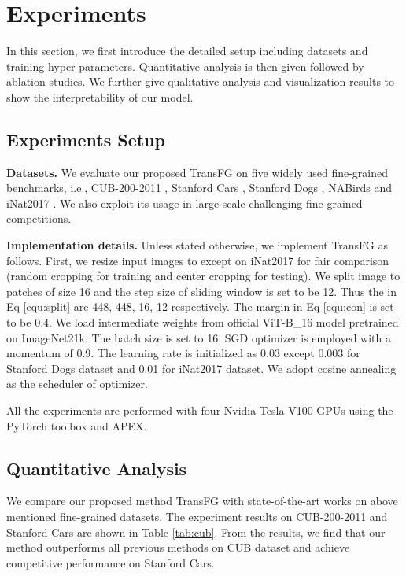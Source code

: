 \section{Experiments}
\label{sec:exp}

In this section, we first introduce the detailed setup including datasets and training hyper-parameters. Quantitative analysis is then given followed by ablation studies. We further give qualitative analysis and visualization results to show the interpretability of our model.

\subsection{Experiments Setup}
\label{sec:setup}

\textbf{Datasets.} We evaluate our proposed TransFG on five widely used fine-grained benchmarks, i.e., CUB-200-2011 \cite{WahCUB_200_2011}, Stanford Cars \cite{KrauseStarkDengFei-Fei_3DRR2013}, Stanford Dogs \cite{KhoslaYaoJayadevaprakashFeiFei_FGVC2011}, NABirds \cite{van2015building} and iNat2017 \cite{van2018inaturalist}. We also exploit its usage in large-scale challenging fine-grained competitions.

\noindent \textbf{Implementation details.}
Unless stated otherwise, we implement TransFG as follows. First, we resize input images to  except  on iNat2017 for fair comparison (random cropping for training and center cropping for testing). We split image to patches of size 16 and the step size of sliding window is set to be 12. Thus the  in Eq \ref{equ:split} are 448, 448, 16, 12 respectively. The margin  in Eq \ref{equ:con} is set to be 0.4. We load intermediate weights from official ViT-B\_16 model pretrained on ImageNet21k. The batch size is set to 16. SGD optimizer is employed with a momentum of 0.9. The learning rate is initialized as 0.03 except 0.003 for Stanford Dogs dataset and 0.01 for iNat2017 dataset. We adopt cosine annealing as the scheduler of optimizer.

All the experiments are performed with four Nvidia Tesla V100 GPUs using the PyTorch toolbox and APEX.

\subsection{Quantitative Analysis}
\label{sec:quan}

We compare our proposed method TransFG with state-of-the-art works on above mentioned fine-grained datasets. The experiment results on CUB-200-2011 and Stanford Cars are shown in Table \ref{tab:cub}. From the results, we find that our method outperforms all previous methods on CUB dataset and achieve competitive performance on Stanford Cars.

